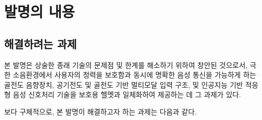 \documentclass{article}
\begin{document}
\newpage


\section{발명의 내용}

\subsection{해결하려는 과제}

본 발명은 상술한 종래 기술의 문제점 및 한계를 해소하기 위하여 창안된 것으로서, 극한 소음환경에서 사용자의 청력을 보호함과 동시에 명확한 음성 통신을 가능하게 하는 골전도 음향장치, 공기전도 및 골전도 기반 멀티모달 입력 구조, 및 인공지능 기반 적응형 음성 신호처리 기술을 보호용 헬멧과 일체화하여 제공하는 데 그 과제가 있다.

보다 구체적으로, 본 발명이 해결하고자 하는 과제는 다음과 같다.
\end{document}
